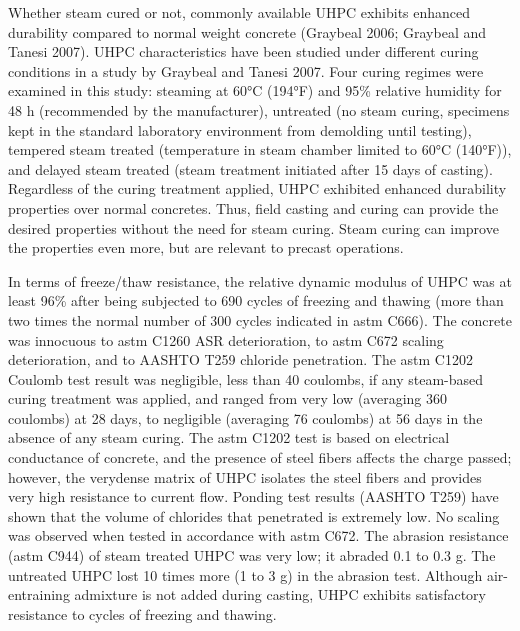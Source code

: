 Whether steam cured or not, commonly available UHPC exhibits enhanced durability compared to normal weight concrete (Graybeal 2006; Graybeal and Tanesi 2007). UHPC characteristics have been studied under different curing conditions in a study by Graybeal and Tanesi 2007. Four curing regimes were examined in this study: steaming at 60°C (194°F) and 95\% relative humidity for 48 h (recommended by the manufacturer), untreated (no steam curing, specimens kept in the standard laboratory environment from demolding until testing), tempered steam treated (temperature in steam chamber limited to 60°C (140°F)), and delayed steam treated (steam treatment initiated after 15 days of casting). Regardless of the curing treatment applied, UHPC exhibited enhanced durability properties over normal concretes. Thus, field casting and curing can provide the desired properties without the need for steam curing. Steam curing can improve the properties even more, but are relevant to precast operations.

In terms of freeze/thaw resistance, the relative dynamic modulus of UHPC was at least 96\% after being subjected to 690 cycles of freezing and thawing (more than two times the normal number of 300 cycles indicated in \acrshort*{astm} C666). The concrete was innocuous to \acrshort*{astm} C1260 ASR deterioration, to \acrshort*{astm} C672 scaling deterioration, and to AASHTO T259 chloride penetration. The \acrshort*{astm} C1202 Coulomb test result was negligible, less than 40 coulombs, if any steam-based curing treatment was applied, and ranged from very low (averaging 360 coulombs) at 28 days, to negligible (averaging 76 coulombs) at 56 days in the absence of any steam curing. The \acrshort*{astm} C1202 test is based on electrical conductance of concrete, and the presence of steel fibers affects the charge passed; however, the verydense matrix of UHPC isolates the steel fibers and provides very high resistance to current flow. Ponding test results (AASHTO T259) have shown that the volume of chlorides that penetrated is extremely low. No scaling was observed when tested in accordance with \acrshort*{astm} C672. The abrasion resistance (\acrshort*{astm} C944) of steam treated UHPC was very low; it abraded 0.1 to 0.3 g. The untreated UHPC lost 10 times more (1 to 3 g) in the abrasion test. Although air-entraining admixture is not added during casting, UHPC exhibits satisfactory resistance to cycles of freezing and thawing.

